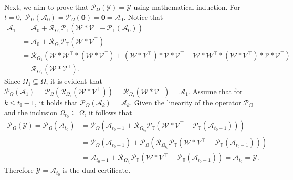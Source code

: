 \documentclass[twoside,12pt]{article}
\begin{document}
Next, we aim to prove that $\mathcal{P}_{\Omega}(\mathcal{Y}) = \mathcal{Y}$ using mathematical induction.
For $t=0,$ $\mathcal{P}_{\Omega}(\mathcal{A}_0) =\mathcal{P}_{\Omega}(\mathbf{0}) = \mathbf{0} = \mathcal{A}_0$.
Notice that  
\begin{align*}
\mathcal{A}_1  &= \mathcal{A}_0 + \mathcal{R}_{\Omega_1}\mathcal{P}_{\mathbb{T}}(\mathcal{W}*\mathcal{V}^{\top}-\mathcal{P}_{\mathbb{T}}(\mathcal{A}_{0})) \\ 
&= \mathcal{A}_0 + \mathcal{R}_{\Omega_1}\mathcal{P}_{\mathbb{T}}(\mathcal{W}*\mathcal{V}^{\top}) \\
& = \mathcal{R}_{\Omega_1}(\mathcal{W} * \mathcal{W}^{\top} * (\mathcal{W}*\mathcal{V}^{\top})+(\mathcal{W}*\mathcal{V}^{\top})* \mathcal{V} * \mathcal{V}^{\top}-\mathcal{W} * \mathcal{W}^{\top} * (\mathcal{W}*\mathcal{V}^{\top}) * \mathcal{V} * \mathcal{V}^{\top}) \\
& = \mathcal{R}_{\Omega_1}(\mathcal{W}*\mathcal{V}^{\top}). 
\end{align*}
Since $\Omega_1 \subseteq \Omega$, it is evident that $  
\mathcal{P}_{\Omega}(\mathcal{A}_1) = \mathcal{P}_{\Omega}(\mathcal{R}_{\Omega_1}(\mathcal{W}*\mathcal{V}^{\top})) = \mathcal{R}_{\Omega_1}(\mathcal{W}*\mathcal{V}^{\top})=\mathcal{A}_1$. 
 Assume that for $k\leq t_{0}-1$, it holds that $\mathcal{P}_{\Omega}(\mathcal{A}_k) = \mathcal{A}_k$. Given the linearity of the operator $\mathcal{P}_{\Omega}$ and the inclusion $\Omega_{t_0}\subseteq \Omega$, it follows that
 \begin{align*}
\mathcal{P}_{\Omega}(\mathcal{Y}) = \mathcal{P}_{\Omega}(\mathcal{A}_{t_0}) 
& = \mathcal{P}_{\Omega}(\mathcal{A}_{{t_0}-1} + \mathcal{R}_{\Omega_{t_0}}\mathcal{P}_{\mathbb{T}}(\mathcal{W}*\mathcal{V}^{\top}-\mathcal{P}_{\mathbb{T}}(\mathcal{A}_{{t_0}-1}))) \\
& = \mathcal{P}_{\Omega}(\mathcal{A}_{{t_0}-1}) +\mathcal{P}_{\Omega}( \mathcal{R}_{\Omega_{t_0}}\mathcal{P}_{\mathbb{T}}(\mathcal{W}*\mathcal{V}^{\top}-\mathcal{P}_{\mathbb{T}}(\mathcal{A}_{{t_0}-1}))) \\
&=\mathcal{A}_{{t_0}-1} + \mathcal{R}_{\Omega_{t_0}}\mathcal{P}_{\mathbb{T}}(\mathcal{W}*\mathcal{V}^{\top}-\mathcal{P}_{\mathbb{T}}(\mathcal{A}_{{t_0}-1})) = \mathcal{A}_{t_0}  = \mathcal{Y}.
\end{align*}
Therefore $\mathcal{Y}=\mathcal{A}_{t_0}$ is the dual certificate.
\end{document}
